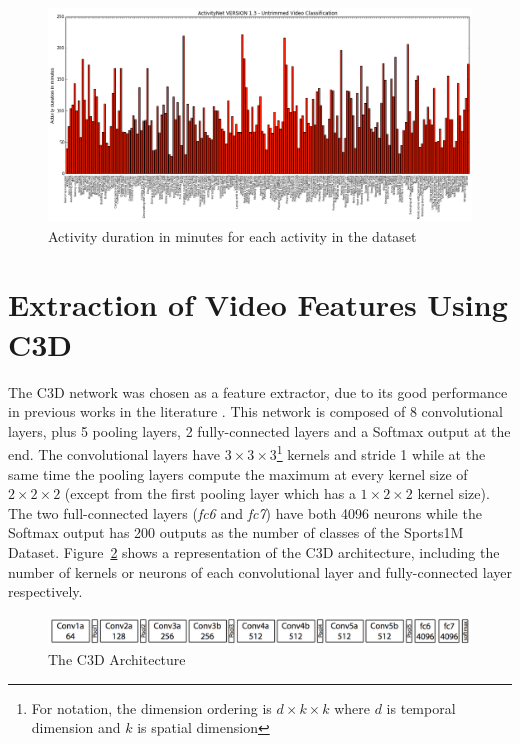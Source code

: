 \begin{figure}[ht]
\begin{center}
\includegraphics[width=1\linewidth]{img/methodology/dataset_stats}
\end{center}
\caption{Activity duration in minutes for each activity in the dataset}
\label{fig:dataset_stats}
\end{figure}

\section{Extraction of Video Features Using C3D}

The C3D network\cite{tran2014learning} was chosen as a feature extractor, due to its good performance in previous works in the literature \cite{baccouche2011sequential,tran2015deep,tran2014learning,shoutemporal}. This network is composed of 8 convolutional layers, plus 5 pooling layers, 2 fully-connected layers and a Softmax output at the end. The convolutional layers have $3 \times 3 \times 3$\footnote{For notation, the dimension ordering is $d \times k \times k$ where $d$ is temporal dimension and $k$ is spatial dimension} kernels and stride 1 while at the same time the pooling layers compute the maximum at every kernel size of $2 \times 2 \times 2$ (except from the first pooling layer which has a $1 \times 2 \times 2$ kernel size). The two full-connected layers (\textit{fc6} and \textit{fc7}) have both 4096 neurons while the Softmax output has 200 outputs as the number of classes of the Sports1M Dataset. Figure~\ref{fig:c3d_architecture} shows a representation of the C3D architecture, including the number of kernels or neurons of each convolutional layer and fully-connected layer respectively.

\begin{figure}[H]
\begin{center}
\includegraphics[width=1\linewidth]{img/methodology/c3d_architecture}
\end{center}
\caption{The C3D Architecture}
\label{fig:c3d_architecture}
\end{figure}

